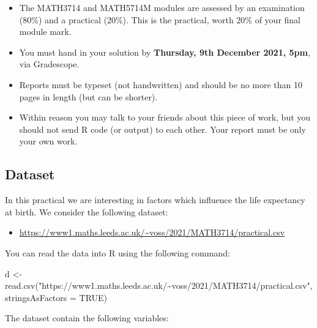 \documentclass[
  a4paper,
]{article}
\newenvironment{Shaded}{\begin{snugshade}}{\end{snugshade}}
\newcommand{\AttributeTok}[1]{\textcolor[rgb]{0.77,0.63,0.00}{#1}}
\newcommand{\ConstantTok}[1]{\textcolor[rgb]{0.00,0.00,0.00}{#1}}
\newcommand{\FunctionTok}[1]{\textcolor[rgb]{0.00,0.00,0.00}{#1}}
\newcommand{\NormalTok}[1]{#1}
\newcommand{\OtherTok}[1]{\textcolor[rgb]{0.56,0.35,0.01}{#1}}
\newcommand{\StringTok}[1]{\textcolor[rgb]{0.31,0.60,0.02}{#1}}
\providecommand{\tightlist}{%
  \setlength{\itemsep}{0pt}\setlength{\parskip}{0pt}}
\theoremstyle{definition}
\theoremstyle{definition}
\theoremstyle{definition}
\theoremstyle{definition}
\theoremstyle{remark}
\begin{document}
\begin{itemize}
\tightlist
\item
  The MATH3714 and MATH5714M modules are assessed by an examination (80\%)
  and a practical (20\%). This is the practical, worth 20\% of your final
  module mark.
\item
  You must hand in your solution
  by \textbf{Thursday, 9th December 2021, 5pm}, via Gradescope.
\item
  Reports must be typeset (not handwritten) and should be no more than 10 pages in length
  (but can be shorter).
\item
  Within reason you may talk to your friends about this piece of work,
  but you should not send R code (or output) to each other.
  Your report must be only your own work.
\end{itemize}

\hypertarget{dataset}{%
\subsection*{Dataset}\label{dataset}}

In this practical we are interesting in factors which influence
the life expectancy at birth. We consider the following dataset:

\begin{itemize}
\tightlist
\item
  \url{https://www1.maths.leeds.ac.uk/~voss/2021/MATH3714/practical.csv}
\end{itemize}

You can read the data into R using the following command:

\begin{Shaded}
\begin{Highlighting}[]
\NormalTok{d }\OtherTok{\textless{}{-}} \FunctionTok{read.csv}\NormalTok{(}\StringTok{"https://www1.maths.leeds.ac.uk/\textasciitilde{}voss/2021/MATH3714/practical.csv"}\NormalTok{,}
              \AttributeTok{stringsAsFactors =} \ConstantTok{TRUE}\NormalTok{)}
\end{Highlighting}
\end{Shaded}

The dataset contain the following variables:
\end{document}

